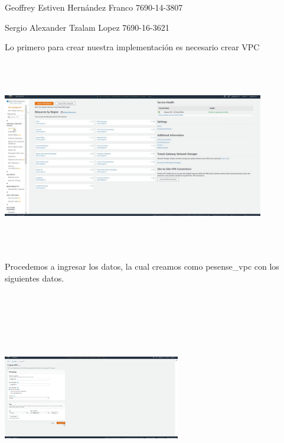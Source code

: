 \documentclass{article} %
\begin{document}
\noindent Geoffrey Estiven Hern\'{a}ndez Franco {\textbar} 7690-14-3807

\noindent Sergio Alexander Tzalam Lopez {\textbar} 7690-16-3621

\noindent Lo primero para crear nuestra implementaci\'{o}n es necesario crear VPC

\noindent 

\noindent \includegraphics*[width=4.51in, height=3.32in, trim=0.00in 0.14in 3.06in 0.11in]{image1}

\noindent 

\noindent 

\noindent Procedemos a ingresar los datos, la cual creamos como pesense\_vpc con los siguientes datos.

\noindent 

\noindent \includegraphics*[width=3.05in, height=3.70in, trim=0.03in 0.17in 5.15in 0.00in]{image2}
\end{document}
